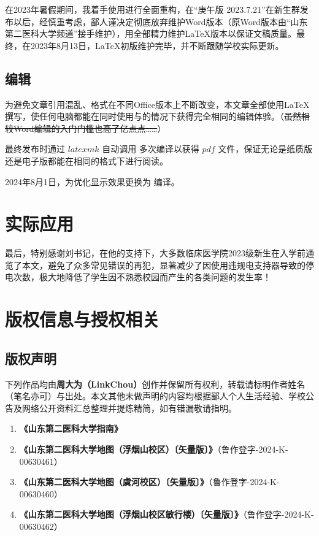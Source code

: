 在2023年暑假期间，我着手使用\XeLaTeX 进行全面重构，在“庚午版 2023.7.21”在新生群发布以后，经慎重考虑，鄙人谨决定彻底放弃维护Word版本（原Word版本由“山东第二医科大学频道”接手维护），用全部精力维护LaTeX版本以保证文稿质量。最终，在2023年8月13日，LaTeX初版维护完毕，并不断跟随学校实际更新。

\subsection[编辑]{编辑}
为避免文章引用混乱、格式在不同Office版本上不断改变，本文章全部使用\LaTeX 撰写，使任何电脑都能在同时使用与\footnotemark 的情况下获得完全相同的编辑体验。（\st{虽然相较Word编辑的入门门槛也高了亿点点……}）

最终发布时通过 $latexmk$ 自动调用 \XeTeX 多次编译以获得 $pdf$ 文件，保证无论是纸质版还是电子版都能在相同的格式下进行阅读。

2024年8月1日，为优化显示效果更换为 \LuaTeX 编译。

\section[实际应用]{实际应用}
最后，特别感谢刘书记，在他的支持下，大多数临床医学院2023级新生在入学前通览了本文，避免了众多常见错误的再犯，显著减少了因使用违规电支持器导致的停电次数，极大地降低了学生因不熟悉校园而产生的各类问题的发生率！

\section[版权信息与授权相关]{版权信息与授权相关}
\label{copyright}
\subsection[版权声明]{版权声明}
下列作品均由\textbf{周大为（LinkChou）}创作并保留所有权利，转载请标明作者姓名（笔名亦可）与出处。本文其他未做声明的内容均根据鄙人个人生活经验、学校公告及网络公开资料汇总整理并提炼精简，如有错漏敬请指明。

\begin{enumerate}
    \item \textbf{《山东第二医科大学指南》}
    \item \textbf{《山东第二医科大学地图（浮烟山校区）〔矢量版〕》}（鲁作登字-2024-K-00630461）
    \item \textbf{《山东第二医科大学地图（虞河校区）〔矢量版〕》}（鲁作登字-2024-K-00630460）
    \item \textbf{《山东第二医科大学地图（浮烟山校区敏行楼）〔矢量版〕》}（鲁作登字-2024-K-00630462）
\end{enumerate}

